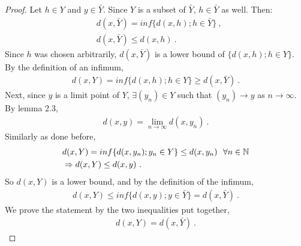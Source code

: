 \begin{questions}


\begin{solution}
  \begin{proof}
 Let $h \in Y$ and $y \in \bar{Y}$. Since $Y$ is a subset of $\bar{Y}$, $h \in \bar{Y}$ as well. Then:
 \begin{align*}
 &d(x,\bar{Y}) = inf\{d(x,h) ; h \in \bar{Y}\}~, \\
 &d(x, \bar{Y}) \leq d(x,h)~.
 \end{align*}
 Since $h$ was chosen arbitrarily, $d(x, \bar{Y})$ is a lower bound of $\{d(x,h);h \in Y\}$. By the definition of an infimum, 
 \begin{align*}
 d(x,Y) = inf\{d(x,h); h \in Y\} \geq d(x, \bar{Y})~.
 \end{align*}
 Next, since $y$ is a limit point of $Y$, $\exists (y_n)\in Y$ such that $(y_n) \rightarrow y$ as $n \rightarrow \infty$. By lemma 2.3,
 \begin{align*}
 d(x,y) = \lim_{n \rightarrow \infty}d(x, y_n)~.
 \end{align*}
Similarly as done before,
 \begin{align*}
 &d(x, Y) = inf\{d(x,y_n); y_n \in Y\}  \leq d(x, y_n)~~\forall n\in\mathbb{N} \\
 &\Rightarrow d(x, Y) \leq d(x,y)~.
 \end{align*}
So $d(x,Y)$ is a lower bound, and by the definition of the infimum,
 \begin{align*}
 d(x,Y) \leq inf\{d(x,y); y \in \bar{Y}\} = d(x, \bar{Y})~.
 \end{align*}
We prove the statement by the two inequalities put together,
\begin{align*}
d(x,Y) = d(x,\bar{Y})~.
\end{align*}
  \end{proof}
\end{solution}


\end{questions}